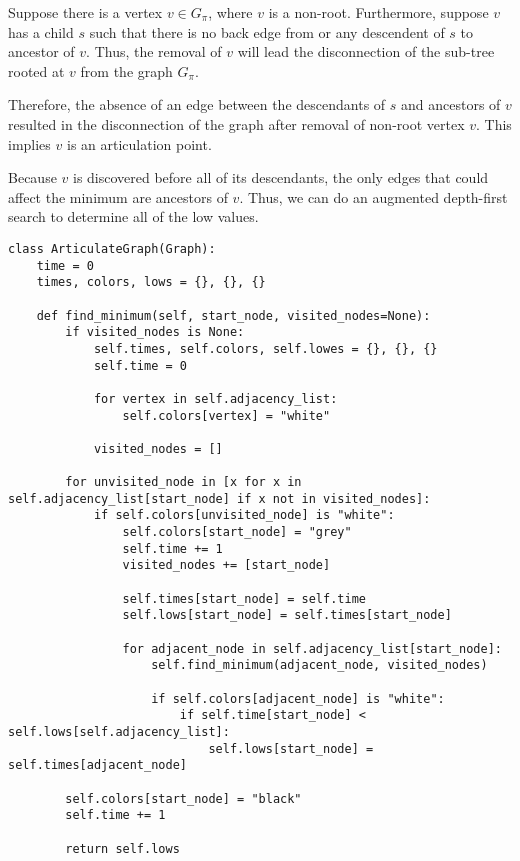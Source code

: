\documentclass[12pt]{scrartcl}
\begin{document}
\subproblem{} %
Suppose there is a vertex $v \in G_\pi$, where $v$ is a non-root. Furthermore, suppose $v$ has a child $s$ such that there is no back edge from or any descendent of $s$ to ancestor of $v$. Thus, the removal of $v$ will lead the disconnection of the sub-tree rooted at $v$ from the graph $G_\pi$.

Therefore, the absence of an edge between the descendants of $s$ and ancestors of $v$ resulted in the disconnection of the graph after removal of non-root vertex $v$. This implies $v$ is an articulation point.


\subproblem{} %
Because $v$ is discovered before all of its descendants, the only edges that could affect the minimum are ancestors of $v$. Thus, we can do an augmented depth-first search to determine all of the low values.

\begin{lstlisting}
class ArticulateGraph(Graph):
    time = 0
    times, colors, lows = {}, {}, {}

    def find_minimum(self, start_node, visited_nodes=None):
        if visited_nodes is None:
            self.times, self.colors, self.lowes = {}, {}, {}
            self.time = 0

            for vertex in self.adjacency_list:
                self.colors[vertex] = "white"

            visited_nodes = []

        for unvisited_node in [x for x in self.adjacency_list[start_node] if x not in visited_nodes]:
            if self.colors[unvisited_node] is "white":
                self.colors[start_node] = "grey"
                self.time += 1
                visited_nodes += [start_node]

                self.times[start_node] = self.time
                self.lows[start_node] = self.times[start_node]

                for adjacent_node in self.adjacency_list[start_node]:
                    self.find_minimum(adjacent_node, visited_nodes)

                    if self.colors[adjacent_node] is "white":
                        if self.time[start_node] < self.lows[self.adjacency_list]:
                            self.lows[start_node] = self.times[adjacent_node]

        self.colors[start_node] = "black"
        self.time += 1

        return self.lows
\end{lstlisting}
\end{document}
